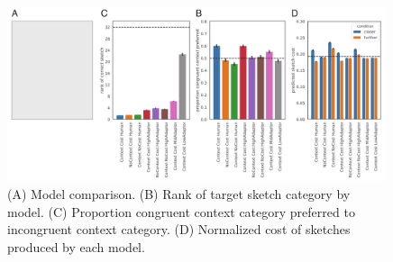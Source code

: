 \documentclass[9pt,twocolumn,twoside]{pnas-new}
\newcommand{\mwu}[1]{{\color{green}{[mwu: #1]}}}
\begin{document}

\begin{figure}[htbp]
\centering
\includegraphics[width=0.99\textwidth]{figures/5_model_results.pdf}
\caption{(A) Model comparison. (B) Rank of target sketch category by model. (C) Proportion congruent context category preferred to incongruent context category. (D) Normalized cost of sketches produced by each model.}
\label{model_results}
\end{figure}
\end{document}
